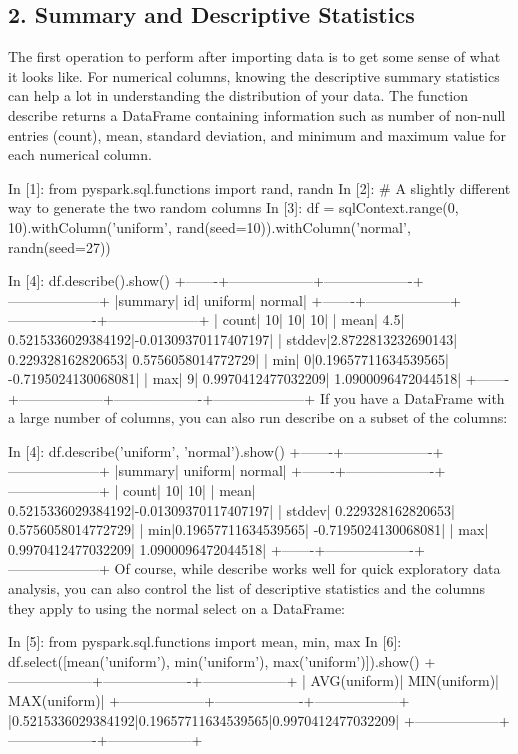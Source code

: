 \subsection*{2. Summary and Descriptive Statistics}
The first operation to perform after importing data is to get some sense of what it looks like. For numerical columns, knowing the descriptive summary statistics can help a lot in understanding the distribution of your data. The function describe returns a DataFrame containing information such as number of non-null entries (count), mean, standard deviation, and minimum and maximum value for each numerical column.

In [1]: from pyspark.sql.functions import rand, randn
In [2]: # A slightly different way to generate the two random columns
In [3]: df = sqlContext.range(0, 10).withColumn('uniform', rand(seed=10)).withColumn('normal', randn(seed=27))

In [4]: df.describe().show()
+-------+------------------+-------------------+--------------------+
|summary|                id|            uniform|              normal|
+-------+------------------+-------------------+--------------------+
|  count|                10|                 10|                  10|
|   mean|               4.5| 0.5215336029384192|-0.01309370117407197|
| stddev|2.8722813232690143|  0.229328162820653|  0.5756058014772729|
|    min|                 0|0.19657711634539565| -0.7195024130068081|
|    max|                 9| 0.9970412477032209|  1.0900096472044518|
+-------+------------------+-------------------+--------------------+
If you have a DataFrame with a large number of columns, you can also run describe on a subset of the columns:

In [4]: df.describe('uniform', 'normal').show()
+-------+-------------------+--------------------+
|summary|            uniform|              normal|
+-------+-------------------+--------------------+
|  count|                 10|                  10|
|   mean| 0.5215336029384192|-0.01309370117407197|
| stddev|  0.229328162820653|  0.5756058014772729|
|    min|0.19657711634539565| -0.7195024130068081|
|    max| 0.9970412477032209|  1.0900096472044518|
+-------+-------------------+--------------------+
Of course, while describe works well for quick exploratory data analysis, you can also control the list of descriptive statistics and the columns they apply to using the normal select on a DataFrame:

In [5]: from pyspark.sql.functions import mean, min, max
In [6]: df.select([mean('uniform'), min('uniform'), max('uniform')]).show()
+------------------+-------------------+------------------+
|      AVG(uniform)|       MIN(uniform)|      MAX(uniform)|
+------------------+-------------------+------------------+
|0.5215336029384192|0.19657711634539565|0.9970412477032209|
+------------------+-------------------+------------------+
